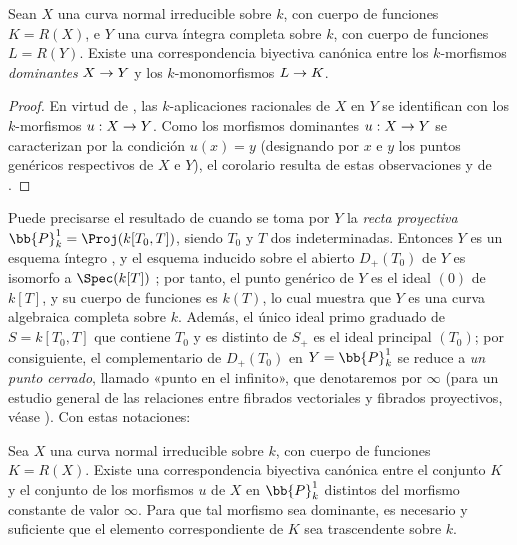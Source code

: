 \documentclass[oneside,10pt]{amsart}
\makeatletter
\newcommand{\ega@arrow}[2]{\mathchoice{#1}{#2}{#2}{#2}}
\renewcommand{\to}{\ega@arrow{\longrightarrow}{\rightarrow}}
\let\EGAOriginalLabel\label
\renewcommand{\label}[1]{\phantomsection\EGAOriginalLabel{#1}}
\makeatother
\begin{document}
\begin{corollary}[7.4.13]
\label{II.7.4.13}
Sean $X$ una curva \textup{normal} irreducible sobre $k$, con cuerpo de funciones $K=R(X)$, e $Y$ una curva íntegra \textup{completa} sobre $k$, con cuerpo de funciones $L=R(Y)$.
Existe una correspondencia biyectiva canónica entre los $k$-morfismos \emph{dominantes} $X\to Y$ y los $k$-monomorfismos $L\to K$.
\end{corollary}

\begin{proof}
En virtud de , las $k$-aplicaciones racionales de $X$ en $Y$ se identifican con los $k$-morfismos $u:X\to Y$.
Como los morfismos dominantes $u:X\to Y$ se caracterizan por la condición $u(x)=y$ (designando por $x$ e $y$ los puntos genéricos respectivos de $X$ e $Y$), el corolario resulta de estas observaciones y de .
\end{proof}

\begin{env}[7.4.14]
\label{II.7.4.14}
Puede precisarse el resultado de  cuando se toma por $Y$ la \emph{recta proyectiva} $\bb{P}_k^1=\Proj(k[T_0,T])$, siendo $T_0$ y $T$ dos indeterminadas.
Entonces $Y$ es un esquema íntegro , y el esquema inducido sobre el abierto $D_+(T_0)$ de $Y$ es isomorfo a $\Spec(k[T])$ ; por tanto, el punto genérico de $Y$ es el ideal $(0)$ de $k[T]$, y su cuerpo de funciones es $k(T)$, lo cual muestra que $Y$ es una curva algebraica completa sobre $k$.
Además, el único ideal primo graduado de $S=k[T_0,T]$ que contiene $T_0$ y es distinto de $S_+$ es el ideal principal $(T_0)$; por consiguiente, el complementario de $D_+(T_0)$ en $Y=\bb{P}_k^1$ se reduce a \emph{un punto cerrado}, llamado «punto en el infinito», que denotaremos por $\infty$ (para un estudio general de las relaciones entre fibrados vectoriales y fibrados proyectivos, véase ).
Con estas notaciones:
\end{env}

\begin{corollary}[7.4.15]
\label{II.7.4.15}
Sea $X$ una curva \textup{normal} irreducible sobre $k$, con cuerpo de funciones $K=R(X)$.
Existe una correspondencia biyectiva canónica entre el conjunto $K$ y el conjunto de los morfismos $u$ de $X$ en $\bb{P}_k^1$ distintos del morfismo constante de valor $\infty$.
Para que tal morfismo sea dominante, es necesario y suficiente que el elemento correspondiente de $K$ sea trascendente sobre $k$.
\end{corollary}
\end{document}

